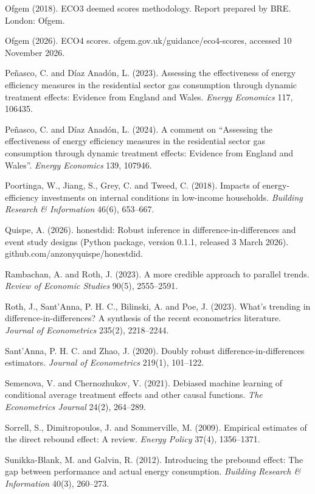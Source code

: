 \documentclass[11pt,a4paper]{article}
\begin{document}
\begin{list}{}{\setlength{\leftmargin}{1.5em}\setlength{\itemindent}{-1.5em}\setlength{\itemsep}{2pt}}
\item
  Ofgem (2018). ECO3 deemed scores methodology. Report prepared by BRE. London: Ofgem.
\item
  Ofgem (2026). ECO4 scores. ofgem.gov.uk/guidance/eco4-scores, accessed 10 November 2026.
\item
  Peñasco, C. and Díaz Anadón, L. (2023). Assessing the effectiveness of energy efficiency measures in the residential sector gas consumption through dynamic treatment effects: Evidence from England and Wales. \emph{Energy Economics} 117, 106435.
\item
  Peñasco, C. and Díaz Anadón, L. (2024). A comment on ``Assessing the effectiveness of energy efficiency measures in the residential sector gas consumption through dynamic treatment effects: Evidence from England and Wales''. \emph{Energy Economics} 139, 107946.
\item
  Poortinga, W., Jiang, S., Grey, C. and Tweed, C. (2018). Impacts of energy-efficiency investments on internal conditions in low-income households. \emph{Building Research \& Information} 46(6), 653--667.
\item
  Quispe, A. (2026). honestdid: Robust inference in difference-in-differences and event study designs (Python package, version 0.1.1, released 3 March 2026). github.com/anzonyquispe/honestdid.
\item
  Rambachan, A. and Roth, J. (2023). A more credible approach to parallel trends. \emph{Review of Economic Studies} 90(5), 2555--2591.
\item
  Roth, J., Sant'Anna, P. H. C., Bilinski, A. and Poe, J. (2023). What's trending in difference-in-differences? A synthesis of the recent econometrics literature. \emph{Journal of Econometrics} 235(2), 2218--2244.
\item
  Sant'Anna, P. H. C. and Zhao, J. (2020). Doubly robust difference-in-differences estimators. \emph{Journal of Econometrics} 219(1), 101--122.
\item
  Semenova, V. and Chernozhukov, V. (2021). Debiased machine learning of conditional average treatment effects and other causal functions. \emph{The Econometrics Journal} 24(2), 264--289.
\item
  Sorrell, S., Dimitropoulos, J. and Sommerville, M. (2009). Empirical estimates of the direct rebound effect: A review. \emph{Energy Policy} 37(4), 1356--1371.
\item
  Sunikka-Blank, M. and Galvin, R. (2012). Introducing the prebound effect: The gap between performance and actual energy consumption. \emph{Building Research \& Information} 40(3), 260--273.

\end{list}
\end{document}
